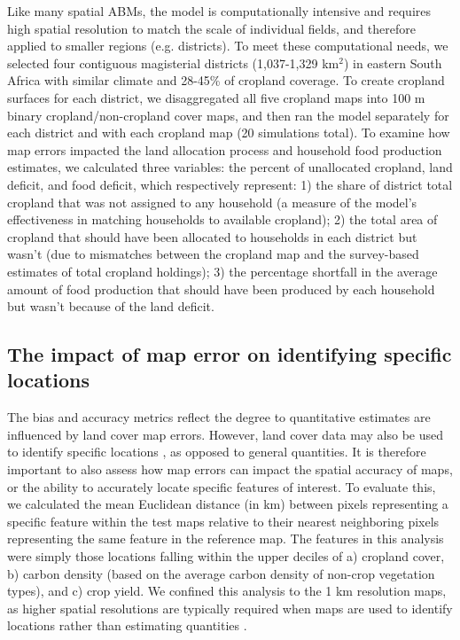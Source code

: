 \documentclass[12 pt, titlepage, a4paper]{article}
\begin{document}
Like many spatial ABMs, the model is computationally intensive and requires high spatial resolution to match the scale of individual fields, and therefore applied to smaller regions (e.g. districts). To meet these computational needs, we selected four contiguous magisterial districts (1,037-1,329 km$^2$) in eastern South Africa with similar climate and 28-45\% of cropland coverage. To create cropland surfaces for each district, we disaggregated all five cropland maps into 100 m binary cropland/non-cropland cover maps, and then ran the model separately for each district and with each cropland map (20 simulations total). To examine how map errors impacted the land allocation process and household food production estimates, we calculated three variables: the percent of unallocated cropland, land deficit, and food deficit, which respectively represent: 1) the share of district total cropland that was not assigned to any household (a measure of the model's effectiveness in matching households to available cropland); 2) the total area of cropland that should have been allocated to households in each district but wasn't (due to mismatches between the cropland map and the survey-based estimates of total cropland holdings); 3) the percentage shortfall in the average amount of food production that should have been produced by each household but wasn't because of the land deficit. 

\vspace{-0.3 cm}
\subsection*{The impact of map error on identifying specific locations}
\vspace{-0.2 cm}
The bias and accuracy metrics reflect the degree to quantitative estimates are influenced by land cover map errors. However, land cover data may also be used to identify specific locations \citep[e.g. areas of high agricultural potential and low ecological cost;][]{estes_reconciling_2016}, as opposed to general quantities. It is therefore important to also assess how map errors can impact the spatial accuracy of maps, or the ability to accurately locate specific features of interest. To evaluate this, we calculated the mean Euclidean distance (in km) between pixels representing a specific feature within the test maps relative to their nearest neighboring pixels representing the same feature in the reference map. The features in this analysis were simply those locations falling within the upper deciles of a) cropland cover, b) carbon density (based on the average carbon density of non-crop vegetation types), and c) crop yield. We confined this analysis to the 1 km resolution maps, as higher spatial resolutions are typically required when maps are used to identify locations rather than estimating quantities \citep[e.g.][]{estes_reconciling_2016}.  
\end{document}
